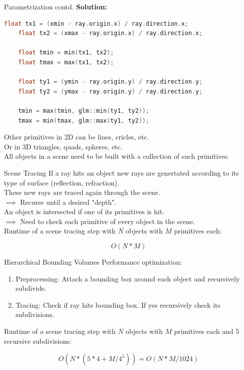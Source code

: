 \documentclass[aspectratio=43,t]{beamer}
\begin{document}
    \begin{frame}[fragile]{Parametrization contd.}
			\textbf{Solution:} \\
			\bigskip
			
		\begin{lstlisting}[language=C++]
  	float tx1 = (xmin - ray.origin.x) / ray.direction.x;
  	float tx2 = (xmax - ray.origin.x) / ray.direction.x;

  	float tmin = min(tx1, tx2);
  	float tmax = max(tx1, tx2);

  	float ty1 = (ymin - ray.origin.y) / ray.direction.y;
  	float ty2 = (ymax - ray.origin.y) / ray.direction.y;

  	tmin = max(tmin, glm::min(ty1, ty2));
  	tmax = min(tmax, glm::max(ty1, ty2));
		\end{lstlisting}
		\bigskip
		Other primitives in 2D can be lines, cricles, etc.\\
		Or in 3D triangles, quads, spheres, etc.\\
		\bigskip
		All objects in a scene need to be built with a collection of such primitives.
    \end{frame}

    \begin{frame}[fragile]{Scene Tracing}
			If a ray hits an object new rays are genertated according to its type
			of surface (reflection, refraction).\\
			\bigskip
			These new rays are traced again through the scene.\\
			\bigskip
			$\implies$ Recurse until a desired "depth".\\
			\bigskip
			An object is intersected if one of its primitives is hit.\\
			\bigskip
			$\implies$ Need to check each primitive of every object in the scene.\\
			\bigskip
			Runtime of a scene tracing step with $N$ objects with $M$ primitives each:

			\begin{equation*}
				O(N * M)
			\end{equation*}
    \end{frame}

    \begin{frame}[fragile]{Hierarchical Bounding Volumes}
			Performance optimization:\\
			\bigskip
      \begin{enumerate}
				\item<2-> Preprocessing: Attach a bounding box around each object and 
					recursively subdivide.
				\item<3-> Tracing: Check if ray hits bounding box. If yes recursively check its
					subdivisions.
      \end{enumerate}
			\bigskip
			Runtime of a scene tracing step with $N$ objects with $M$ primitives each
			and 5 recursive subdivisions:

			\begin{equation*}
				O(N * (5*4 + M/4^5)) = O(N * M/1024)
			\end{equation*}
    \end{frame}
\end{document}
